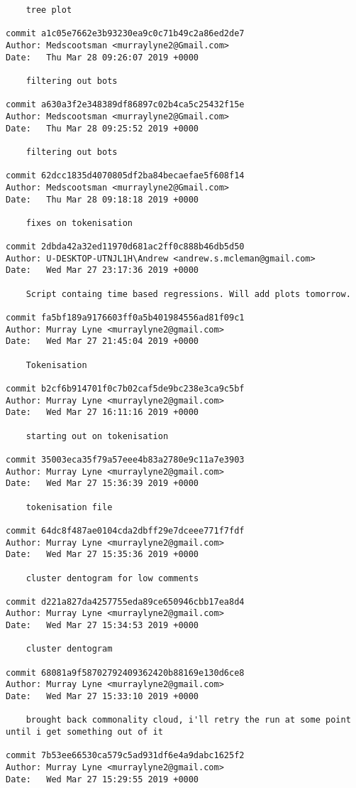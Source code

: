 \begin{lstlisting}
    tree plot

commit a1c05e7662e3b93230ea9c0c71b49c2a86ed2de7
Author: Medscootsman <murraylyne2@Gmail.com>
Date:   Thu Mar 28 09:26:07 2019 +0000

    filtering out bots

commit a630a3f2e348389df86897c02b4ca5c25432f15e
Author: Medscootsman <murraylyne2@Gmail.com>
Date:   Thu Mar 28 09:25:52 2019 +0000

    filtering out bots

commit 62dcc1835d4070805df2ba84becaefae5f608f14
Author: Medscootsman <murraylyne2@Gmail.com>
Date:   Thu Mar 28 09:18:18 2019 +0000

    fixes on tokenisation

commit 2dbda42a32ed11970d681ac2ff0c888b46db5d50
Author: U-DESKTOP-UTNJL1H\Andrew <andrew.s.mcleman@gmail.com>
Date:   Wed Mar 27 23:17:36 2019 +0000

    Script containg time based regressions. Will add plots tomorrow.

commit fa5bf189a9176603ff0a5b401984556ad81f09c1
Author: Murray Lyne <murraylyne2@gmail.com>
Date:   Wed Mar 27 21:45:04 2019 +0000

    Tokenisation

commit b2cf6b914701f0c7b02caf5de9bc238e3ca9c5bf
Author: Murray Lyne <murraylyne2@gmail.com>
Date:   Wed Mar 27 16:11:16 2019 +0000

    starting out on tokenisation

commit 35003eca35f79a57eee4b83a2780e9c11a7e3903
Author: Murray Lyne <murraylyne2@gmail.com>
Date:   Wed Mar 27 15:36:39 2019 +0000

    tokenisation file

commit 64dc8f487ae0104cda2dbff29e7dceee771f7fdf
Author: Murray Lyne <murraylyne2@gmail.com>
Date:   Wed Mar 27 15:35:36 2019 +0000

    cluster dentogram for low comments

commit d221a827da4257755eda89ce650946cbb17ea8d4
Author: Murray Lyne <murraylyne2@gmail.com>
Date:   Wed Mar 27 15:34:53 2019 +0000

    cluster dentogram

commit 68081a9f58702792409362420b88169e130d6ce8
Author: Murray Lyne <murraylyne2@gmail.com>
Date:   Wed Mar 27 15:33:10 2019 +0000

    brought back commonality cloud, i'll retry the run at some point until i get something out of it

commit 7b53ee66530ca579c5ad931df6e4a9dabc1625f2
Author: Murray Lyne <murraylyne2@gmail.com>
Date:   Wed Mar 27 15:29:55 2019 +0000


\end{lstlisting}
